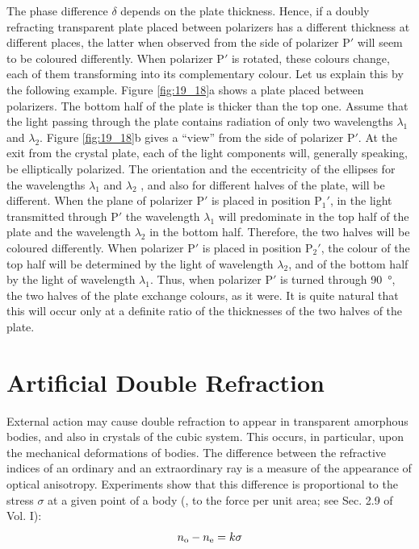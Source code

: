 The phase difference $\delta$ depends on the plate thickness.
Hence, if a doubly refracting transparent plate placed between polarizers has a different thickness at different places, the latter when observed from the side of polarizer P$'$ will seem to be coloured differently.
When polarizer P$'$ is rotated, these colours change, each of them transforming into its complementary colour.
Let us explain this by the following example. Figure \ref{fig:19_18}a shows a plate placed between polarizers.
The bottom half of the plate is thicker than the top one.
Assume that the light passing through the plate contains radiation of only two wavelengths $\lambda_1$ and $\lambda_2$.
Figure \ref{fig:19_18}b gives a ``view'' from
the side of polarizer P$'$.
At the exit from the crystal plate, each of the light components will, generally speaking, be elliptically polarized.
The orientation and the eccentricity of the ellipses for the wavelengths $\lambda_1$ and $\lambda_2$ , and also for different halves of the plate, will be different.
When the plane of polarizer P$'$ is placed in position P$_1'$, in the light transmitted through P$'$ the wavelength $\lambda_1$ will predominate
in the top half of the plate and the wavelength $\lambda_2$ in the bottom half.
Therefore, the two halves will be coloured differently.
When polarizer P$'$ is placed in position P$_2'$, the colour of the top half will be determined by the light of wavelength $\lambda_2$, and of the
bottom half by the light of wavelength $\lambda_1$.
Thus, when polarizer P$'$ is turned through \SI{90}{\degree}, the two halves of the plate exchange colours, as it were.
It is quite natural that this will occur only at a definite ratio of the thicknesses of the two halves of the plate.

\section{Artificial Double Refraction}\label{sec:19_7}

External action may cause double refraction to appear in transparent amorphous bodies, and also in crystals of the cubic system.
This occurs, in particular, upon the mechanical deformations of bodies.
The difference between the refractive indices of an ordinary and an extraordinary ray is a measure of the appearance of optical anisotropy. Experiments show that this difference is proportional to the stress $\sigma$ at a given point of a body (\ie, to the force per unit area;
see Sec. 2.9 of Vol. I):
\begin{equation}\label{eq:19_19}
	n_{\text{o}} - n_{\text{e}} = k \sigma
\end{equation}

